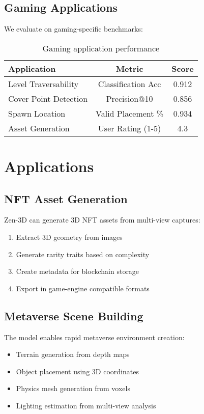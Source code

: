 \documentclass[11pt,a4paper]{article}
\begin{document}
\subsection{Gaming Applications}

We evaluate on gaming-specific benchmarks:

\begin{table}[h]
\centering
\begin{tabular}{lcc}
\toprule
Application & Metric & Score \\
\midrule
Level Traversability & Classification Acc & 0.912 \\
Cover Point Detection & Precision@10 & 0.856 \\
Spawn Location & Valid Placement \% & 0.934 \\
Asset Generation & User Rating (1-5) & 4.3 \\
\bottomrule
\end{tabular}
\caption{Gaming application performance}
\end{table}

\section{Applications}

\subsection{NFT Asset Generation}

Zen-3D can generate 3D NFT assets from multi-view captures:

\begin{enumerate}
\item Extract 3D geometry from images
\item Generate rarity traits based on complexity
\item Create metadata for blockchain storage
\item Export in game-engine compatible formats
\end{enumerate}

\subsection{Metaverse Scene Building}

The model enables rapid metaverse environment creation:

\begin{itemize}
\item Terrain generation from depth maps
\item Object placement using 3D coordinates
\item Physics mesh generation from voxels
\item Lighting estimation from multi-view analysis
\end{itemize}
\end{document}
